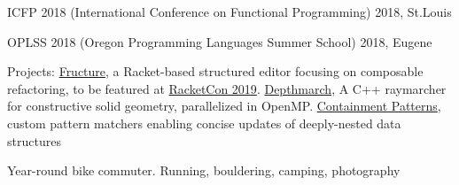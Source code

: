 \documentclass[10pt,a4paper]{article}
\begin{document}
  \headedsubsection
    {ICFP 2018 (International Conference on Functional Programming)}
    {2018, St.Louis}
    {}
    
  \headedsubsection
    {OPLSS 2018 (Oregon Programming Languages Summer School)}
    {2018, Eugene}
    {}


\spacedhrule{0.6em}{-0.4em}


\inlineheadsection
  {Projects:}
  {\href{https://github.com/disconcision/fructure}{Fructure}, a Racket-based structured editor focusing on composable refactoring, to be featured at \href{https://con.racket-lang.org/#speakers}{RacketCon 2019}. \href{https://github.com/disconcision/depthmarch}{Depthmarch}, A C++ raymarcher for constructive solid geometry, parallelized in OpenMP. \href{https://github.com/disconcision/containment-patterns}{Containment Patterns}, custom pattern matchers enabling concise updates of deeply-nested data structures}


\vspace{0.8em}

\spacedhrule{0.6em}{-0.4em}


\inlineheadsection
  {}{Year-round bike commuter. Running, bouldering, camping, photography}
\end{document}
